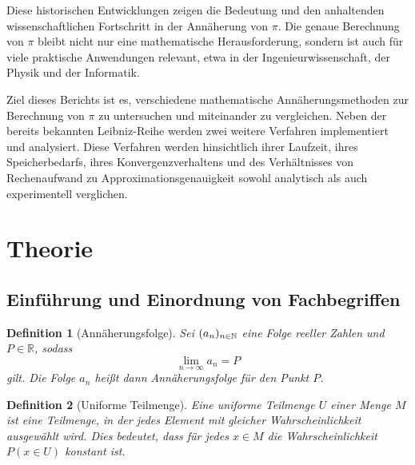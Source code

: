 \documentclass{scrartcl}
\newtheorem{definition}{Definition}
\theoremstyle{definition}
\newtheorem{approximation sequence}{Annäherungsfolge}
\DeclarePairedDelimiter{\paren}{\lparen}{\rparen}
\newcommand{\field}[1]{\mathbb{#1}}
\newcommand{\nats}{\field{N}}
\newcommand{\reals}{\field{R}}
\begin{document}
Diese historischen Entwicklungen zeigen die Bedeutung und den anhaltenden
wissenschaftlichen Fortschritt in der Annäherung von \(\pi\). Die genaue
Berechnung von \(\pi\) bleibt nicht nur eine mathematische Herausforderung,
sondern ist auch für viele praktische Anwendungen relevant, etwa in der
Ingenieurwissenschaft, der Physik und der Informatik.

Ziel dieses Berichts ist es, verschiedene mathematische Annäherungsmethoden zur
Berechnung von \(\pi\) zu untersuchen und miteinander zu vergleichen. Neben der
bereits bekannten Leibniz-Reihe werden zwei weitere Verfahren implementiert und
analysiert. Diese Verfahren werden hinsichtlich ihrer Laufzeit, ihres
Speicherbedarfs, ihres Konvergenzverhaltens und des Verhältnisses von
Rechenaufwand zu Approximationsgenauigkeit sowohl analytisch als auch
experimentell verglichen.

\section{Theorie}

\subsection{Einführung und Einordnung von Fachbegriffen}

\begin{definition}[Annäherungsfolge]
    Sei \(\paren{a_n}_{n \in \nats}\) eine Folge reeller Zahlen und \(P \in
    \reals\), sodass
    \begin{equation}
        \lim_{n \to \infty} a_n = P
    \end{equation}
    gilt. Die Folge \(a_n\) heißt dann Annäherungsfolge für den Punkt \(P\).
\end{definition}

\begin{definition}[Uniforme Teilmenge]
    Eine uniforme Teilmenge \(U\) einer Menge \(M\) ist eine Teilmenge, in der
    jedes Element mit gleicher Wahrscheinlichkeit ausgewählt wird.
    Dies bedeutet, dass für jedes \(x \in M\) die Wahrscheinlichkeit \(P(x \in U)\)
    konstant ist.
\end{definition}
\end{document}
